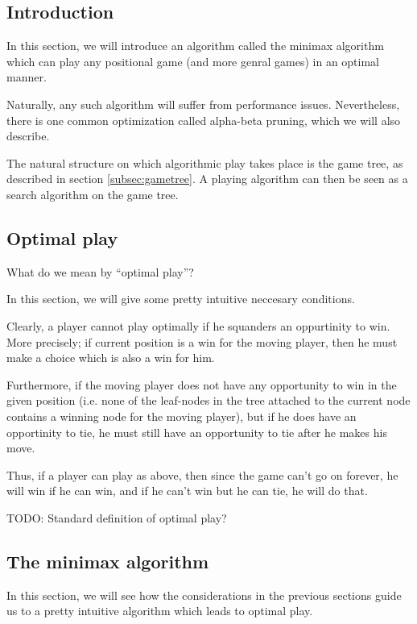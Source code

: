 \subsection{Introduction}

In this section, we will introduce an algorithm called the minimax algorithm which can play any positional game (and more genral games) in an optimal manner.

Naturally, any such algorithm will suffer from performance issues.
Nevertheless, there is one common optimization called alpha-beta pruning, which we will also describe.

The natural structure on which algorithmic play takes place is the game tree, as described in section \ref{subsec:gametree}.
A playing algorithm can then be seen as a search algorithm on the game tree.


\subsection{Optimal play}

What do we mean by ``optimal play''?

In this section, we will give some pretty intuitive neccesary conditions.

Clearly, a player cannot play optimally if he squanders an oppurtinity to win.
More precisely; if current position is a win for the moving player, then he must make a choice which is also a win for him.

Furthermore, if the moving player does not have any opportunity to win in the given position (i.e. none of the leaf-nodes in the tree attached to the current node contains a winning node for the moving player), but if he does have an opportinity to tie, he must still have an opportunity to tie after he makes his move.

Thus, if a player can play as above, then since the game can't go on forever, he will win if he can win, and if he can't win but he can tie, he will do that.


TODO: Standard definition of optimal play?


\subsection{The minimax algorithm}

In this section, we will see how the considerations in the previous sections guide us to a pretty intuitive algorithm which leads to optimal play.

